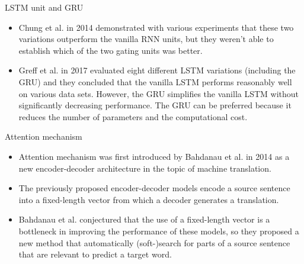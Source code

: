 \documentclass[10pt]{beamer}
\begin{document}
\begin{frame}{LSTM unit and GRU}

\begin{itemize}
\item
Chung et al. \cite{chung2014empirical} in 2014 demonstrated with various experiments that these two variations outperform the vanilla RNN units, but they weren't able to establish which of the two gating units was better.
\item
Greff et al. \cite{greff2016lstm} in 2017 evaluated eight different LSTM variations (including the GRU) and they concluded that the vanilla LSTM performs reasonably well on various data sets. However, the GRU simplifies the vanilla LSTM without significantly decreasing performance. The GRU can be preferred because it reduces the number of parameters and the computational cost.
\end{itemize}

\end{frame}


\begin{frame}{Attention mechanism}
\begin{itemize}
\item
Attention mechanism was first introduced by Bahdanau et al. in 2014 \cite{bahdanau2014neural} as a new encoder-decoder architecture in the topic of machine translation.
\item
The previously proposed encoder-decoder models encode a source sentence into a fixed-length vector from which a decoder generates a translation.
\item
Bahdanau et al. conjectured that the use of a fixed-length vector is a bottleneck in improving the performance of these models, so they proposed a new method that automatically (soft-)search for parts of a source sentence that are relevant to predict a target word.
\end{itemize}
\end{frame}
\end{document}
